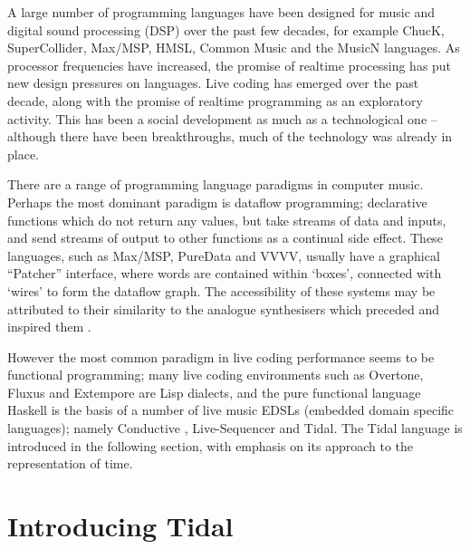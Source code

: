 \documentclass[authoryear,preprint]{sigplanconf}
\begin{document}
A large number of programming languages have been designed for music
and digital sound processing (DSP) over the past few decades, for
example ChucK, SuperCollider, Max/MSP, HMSL, Common Music and the
MusicN languages. As processor frequencies have increased, the promise
of realtime processing has put new design pressures on languages. Live
coding has emerged over the past decade, along with the promise of
realtime programming as an exploratory activity. This has been a
social development as much as a technological one -- although there
have been breakthroughs, much of the technology was already in place.

There are a range of programming language paradigms in computer
music. Perhaps the most dominant paradigm is dataflow programming;
declarative functions which do not return any values, but take streams
of data and inputs, and send streams of output to other functions as a
continual side effect. These languages, such as Max/MSP, PureData and
VVVV, usually have a graphical ``Patcher'' interface, where words are
contained within `boxes', connected with `wires' to form the dataflow
graph. The accessibility of these systems may be attributed to their
similarity to the analogue synthesisers which preceded and inspired
them \citep{Puckette88}.

However the most common paradigm in live coding performance seems to
be functional programming; many live coding environments such as
Overtone, Fluxus and Extempore are Lisp dialects, and the pure
functional language Haskell is the basis of a number of live music
EDSLs (embedded domain specific languages); namely Conductive
\citep{Bell11}, Live-Sequencer \citep{Thielemann12} and Tidal. The
Tidal language is introduced in the following section, with emphasis
on its approach to the representation of time.

\section{Introducing Tidal}
\label{sec:intro}
\end{document}
